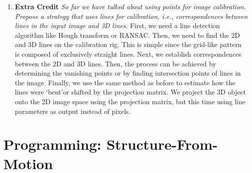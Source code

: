 \documentclass[11pt]{article}
\begin{document}
\begin{enumerate}
        \item \textbf{Extra Credit} \textit{So far we have talked about using points for image calibration. Propose a
        strategy that uses lines for calibration, i.e., correspondences between lines in the input image and 3D
        lines.}\newline
        First, we need a line detection algorithm like Hough transform or RANSAC. Then, we need to find the 2D and 3D
        lines on the calibration rig. This is simple since the grid-like pattern is composed of exclusively straight
        lines. Next, we establish correspondences between the 2D and 3D lines. Then, the process can be achieved
        by determining the vanishing points or by finding intersection points of lines in the image. Finally, we use
        the same method as before to estimate how the lines were \textquoteleft bent\textquoteright or shifted by the
        projection matrix.\newline
        We project the 3D object onto the 2D image space using the projection matrix, but this time using line
        parameters as output instead of pixels.\newline
    \end{enumerate}


    \section{Programming: Structure-From-Motion}
\end{document}
